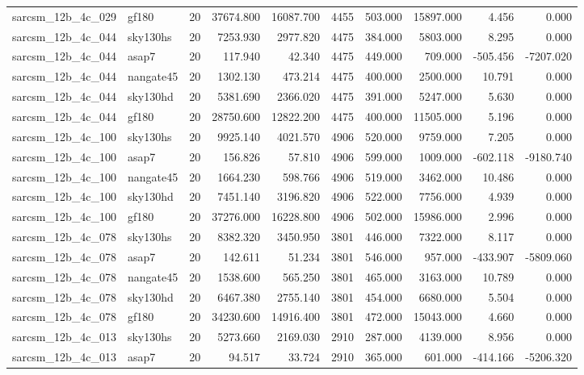 \begin{longtable}{llrrrrrrrr}
sarcsm\_12b\_4c\_029 & gf180 & 20 & 37674.800 & 16087.700 & 4455 & 503.000 & 15897.000 & 4.456 & 0.000 \\
sarcsm\_12b\_4c\_044 & sky130hs & 20 & 7253.930 & 2977.820 & 4475 & 384.000 & 5803.000 & 8.295 & 0.000 \\
sarcsm\_12b\_4c\_044 & asap7 & 20 & 117.940 & 42.340 & 4475 & 449.000 & 709.000 & -505.456 & -7207.020 \\
sarcsm\_12b\_4c\_044 & nangate45 & 20 & 1302.130 & 473.214 & 4475 & 400.000 & 2500.000 & 10.791 & 0.000 \\
sarcsm\_12b\_4c\_044 & sky130hd & 20 & 5381.690 & 2366.020 & 4475 & 391.000 & 5247.000 & 5.630 & 0.000 \\
sarcsm\_12b\_4c\_044 & gf180 & 20 & 28750.600 & 12822.200 & 4475 & 400.000 & 11505.000 & 5.196 & 0.000 \\
sarcsm\_12b\_4c\_100 & sky130hs & 20 & 9925.140 & 4021.570 & 4906 & 520.000 & 9759.000 & 7.205 & 0.000 \\
sarcsm\_12b\_4c\_100 & asap7 & 20 & 156.826 & 57.810 & 4906 & 599.000 & 1009.000 & -602.118 & -9180.740 \\
sarcsm\_12b\_4c\_100 & nangate45 & 20 & 1664.230 & 598.766 & 4906 & 519.000 & 3462.000 & 10.486 & 0.000 \\
sarcsm\_12b\_4c\_100 & sky130hd & 20 & 7451.140 & 3196.820 & 4906 & 522.000 & 7756.000 & 4.939 & 0.000 \\
sarcsm\_12b\_4c\_100 & gf180 & 20 & 37276.000 & 16228.800 & 4906 & 502.000 & 15986.000 & 2.996 & 0.000 \\
sarcsm\_12b\_4c\_078 & sky130hs & 20 & 8382.320 & 3450.950 & 3801 & 446.000 & 7322.000 & 8.117 & 0.000 \\
sarcsm\_12b\_4c\_078 & asap7 & 20 & 142.611 & 51.234 & 3801 & 546.000 & 957.000 & -433.907 & -5809.060 \\
sarcsm\_12b\_4c\_078 & nangate45 & 20 & 1538.600 & 565.250 & 3801 & 465.000 & 3163.000 & 10.789 & 0.000 \\
sarcsm\_12b\_4c\_078 & sky130hd & 20 & 6467.380 & 2755.140 & 3801 & 454.000 & 6680.000 & 5.504 & 0.000 \\
sarcsm\_12b\_4c\_078 & gf180 & 20 & 34230.600 & 14916.400 & 3801 & 472.000 & 15043.000 & 4.660 & 0.000 \\
sarcsm\_12b\_4c\_013 & sky130hs & 20 & 5273.660 & 2169.030 & 2910 & 287.000 & 4139.000 & 8.956 & 0.000 \\
sarcsm\_12b\_4c\_013 & asap7 & 20 & 94.517 & 33.724 & 2910 & 365.000 & 601.000 & -414.166 & -5206.320 \\

\end{longtable}
